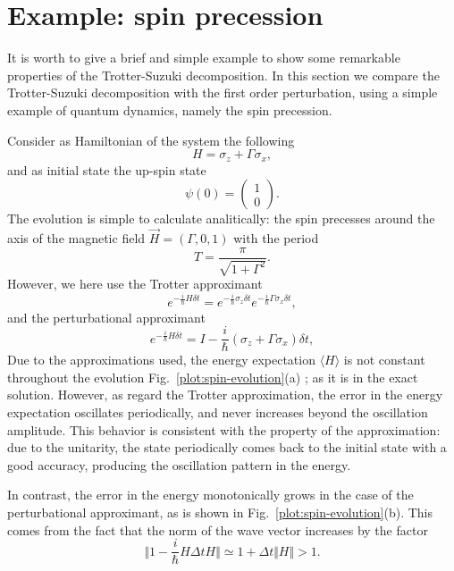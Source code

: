 \section{Example: spin precession}

It is worth to give a brief and simple example to show some remarkable properties of the Trotter-Suzuki decomposition. In this section we compare the Trotter-Suzuki decomposition with the first order perturbation, using a simple example of quantum dynamics, namely the spin precession.

Consider as Hamiltonian of the system the following
\begin{equation}
H = \sigma_z + \Gamma \sigma_x,
\end{equation}
and as initial state the up-spin state
\begin{equation}
\psi(0) = 
\begin{pmatrix}
1 \\ 0
\end{pmatrix}.
\end{equation}
The evolution is simple to calculate analitically: the spin precesses around the axis of the magnetic field $\vec{H} = (\Gamma, 0, 1)$ with the period
\begin{equation}
T = \frac{\pi}{\sqrt{1+\Gamma^2}}.
\end{equation}
However, we here use the Trotter approximant
\begin{equation} \label{eq:trotter-approximant}
e^{-\frac{i}{\hbar}H \delta t} = e^{-\frac{i}{\hbar} \sigma_z \delta t} e^{-\frac{i}{\hbar} \Gamma \sigma_x \delta t},
\end{equation}
and the perturbational approximant
\begin{equation} \label{eq:perturbational-approximant}
e^{-\frac{i}{\hbar}H \delta t} = I - \frac{i}{\hbar}(\sigma_z + \Gamma\sigma_x) \delta t,
\end{equation}
Due to the approximations used, the energy expectation $\langle H \rangle$ is not constant throughout the evolution Fig.~\ref{plot:spin-evolution}(a) ; as it is in the exact solution. However, as regard the Trotter approximation, the error in the energy expectation oscillates periodically, and never increases beyond the oscillation amplitude. This behavior is consistent with the property of the approximation: due to the unitarity, the state periodically comes back to the initial state with a good accuracy, producing the oscillation pattern in the energy.

In contrast, the error in the energy monotonically grows in the case of the perturbational approximant, as is shown in Fig.~\ref{plot:spin-evolution}(b). This comes from the fact that the norm of the wave vector increases by the factor
\begin{equation}
\Vert 1 - \frac{i}{\hbar} H \Delta t H \Vert \simeq 1 + \Delta t \Vert H \Vert > 1.
\end{equation}

